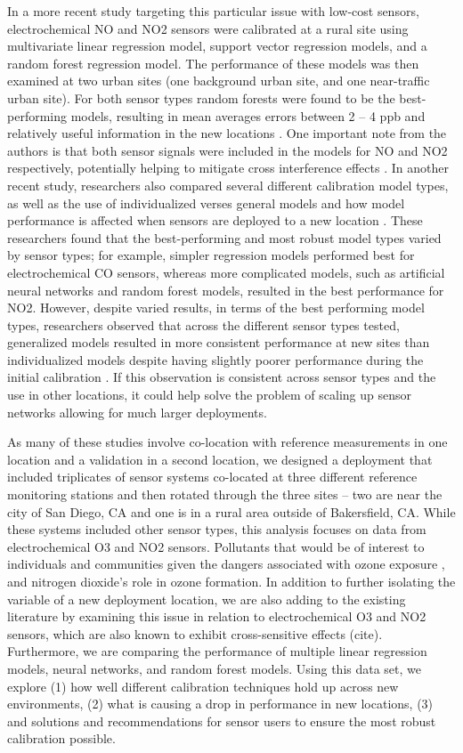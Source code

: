 \documentclass[journal abbreviation, manuscript]{copernicus}
\begin{document}
In a more recent study targeting this particular issue with low-cost sensors, electrochemical NO and NO2 sensors were calibrated at a rural site using multivariate linear regression model, support vector regression models, and a random forest regression model. The performance of these models was then examined at two urban sites (one background urban site, and one near-traffic urban site). For both sensor types random forests were found to be the best-performing models, resulting in mean averages errors between 2 – 4 ppb and relatively useful information in the new locations \citep{Bigi2018Performance}. One important note from the authors is that both sensor signals were included in the models for NO and NO2 respectively, potentially helping to mitigate cross interference effects \citep{Bigi2018Performance}. In another recent study, researchers also compared several different calibration model types, as well as the use of individualized verses general models and how model performance is affected when sensors are deployed to a new location \citep{Malings2018Development}. These researchers found that the best-performing and most robust model types varied by sensor types; for example, simpler regression models performed best for electrochemical CO sensors, whereas more complicated models, such as artificial neural networks and random forest models, resulted in the best performance for NO2. However, despite varied results, in terms of the best performing model types, researchers observed that across the different sensor types tested, generalized models resulted in more consistent performance at new sites than individualized models despite having slightly poorer performance during the initial calibration \citep{Malings2018Development}.  If this observation is consistent across sensor types and the use in other locations, it could help solve the problem of scaling up sensor networks allowing for much larger deployments. 
 
As many of these studies involve co-location with reference measurements in one location and a validation in a second location, we designed a deployment that included triplicates of sensor systems co-located at three different reference monitoring stations and then rotated through the three sites – two are near the city of San Diego, CA and one is in a rural area outside of Bakersfield, CA. While these systems included other sensor types, this analysis focuses on data from electrochemical O3 and NO2 sensors. Pollutants that would be of interest to individuals and communities given the dangers associated with ozone exposure \citep{Brunekreef2002Air}, and nitrogen dioxide’s role in ozone formation. In addition to further isolating the variable of a new deployment location, we are also adding to the existing literature by examining this issue in relation to electrochemical O3 and NO2 sensors, which are also known to exhibit cross-sensitive effects (cite). Furthermore, we are comparing the performance of multiple linear regression models, neural networks, and random forest models. Using this data set, we explore (1) how well different calibration techniques hold up across new environments, (2) what is causing a drop in performance in new locations, (3) and solutions and recommendations for sensor users to ensure the most robust calibration possible. 
\end{document}
